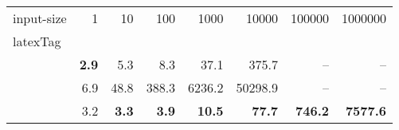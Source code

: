\begin{tabular}{lrrrrrrr}
\toprule
input-size & 1 & 10 & 100 & 1000 & 10000 & 100000 & 1000000 \\
latexTag &  &  &  &  &  &  &  \\
\midrule
\seecAesCbcNoSetupScStaticLayers{} & \bfseries 2.9 & 5.3 & 8.3 & 37.1 & 375.7 & -- & -- \\
\seecAesCbcNoSetup{} & 6.9 & 48.8 & 388.3 & 6236.2 & 50298.9 & -- & -- \\
\seecAesCtrNoSetup{} & 3.2 & \bfseries 3.3 & \bfseries 3.9 & \bfseries 10.5 & \bfseries 77.7 & \bfseries 746.2 & \bfseries 7577.6 \\
\bottomrule
\end{tabular}

